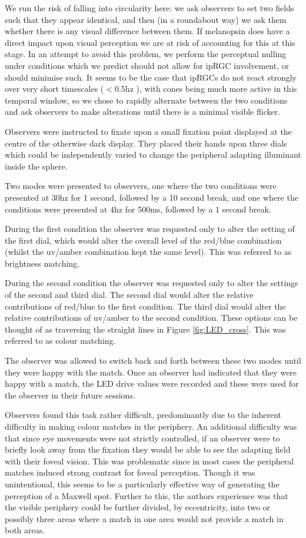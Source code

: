 We run the risk of falling into circularity here: we ask observers to set two fields such that they appear identical, and then (in a roundabout way) we ask them whether there is any visual difference between them. If melanopsin does have a direct impact upon visual perception we are at risk of accounting for this at this stage. In an attempt to avoid this problem, we perform the perceptual nulling under conditions which we predict should not allow for \gls{ipRGC} involvement, or should minimise such. It seems to be the case that \glspl{ipRGC} do not react strongly over very short timescales ($<$0.5hz \citep{spitschan_human_2017-1}), with cones being much more active in this temporal window, so we chose to rapidly alternate between the two conditions and ask observers to make alterations until there is a minimal visible flicker.

Observers were instructed to fixate upon a small fixation point displayed at the centre of the otherwise dark display. They placed their hands upon three dials which could be independently varied to change the peripheral adapting illuminant inside the sphere.

Two modes were presented to observers, one where the two conditions were presented at 30hz for 1 second, followed by a 10 second break, and one where the conditions were presented at 4hz for 500ms, followed by a 1 second break. 

During the first condition the observer was requested only to alter the setting of the first dial, which would alter the overall level of the red/blue combination (whilst the uv/amber combination kept the same level). This was referred to as brightness matching.

During the second condition the observer was requested only to alter the settings of the second and third dial. The second dial would alter the relative contributions of red/blue to the first condition. The third dial would alter the relative contributions of uv/amber to the second condition. These options can be thought of as traversing the straight lines in Figure \ref{fig:LED_cross}. This was referred to as colour matching.

The observer was allowed to switch back and forth between these two modes until they were happy with the match. Once an observer had indicated that they were happy with a match, the LED drive values were recorded and these were used for the observer in their future sessions.

Observers found this task rather difficult, predominantly due to the inherent difficulty in making colour matches in the periphery. An additional difficulty was that since eye movements were not strictly controlled, if an observer were to briefly look away from the fixation they would be able to see the adapting field with their foveal vision. This was problematic since in most cases the peripheral matches induced strong contrast for foveal perception. Though it was unintentional, this seems to be a particularly effective way of generating the perception of a Maxwell spot. Further to this, the authors experience was that the visible periphery could be further divided, by eccentricity, into two or possibly three areas where a match in one area would not provide a match in both areas.

